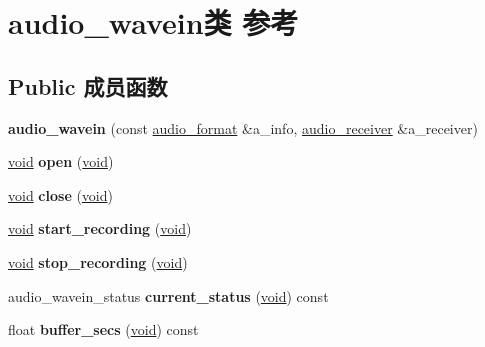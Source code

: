 \hypertarget{classaudio__wavein}{}\section{audio\+\_\+wavein类 参考}
\label{classaudio__wavein}
\subsection*{Public 成员函数}
\begin{DoxyCompactItemize}
\item 
\mbox{\label{classaudio__wavein_a3f4a60db164a3646b027a32fa001e06b}} 
{\bfseries audio\+\_\+wavein} (const \hyperlink{classaudio__format}{audio\+\_\+format} \&a\+\_\+info, \hyperlink{classaudio__receiver}{audio\+\_\+receiver} \&a\+\_\+receiver)
\item 
\mbox{\label{classaudio__wavein_a0a6dfe71a9333665ee17277e94676b23}} 
\hyperlink{interfacevoid}{void} {\bfseries open} (\hyperlink{interfacevoid}{void})
\item 
\mbox{\label{classaudio__wavein_af5d19fc68e399a74c563c0e938ca2d3a}} 
\hyperlink{interfacevoid}{void} {\bfseries close} (\hyperlink{interfacevoid}{void})
\item 
\mbox{\label{classaudio__wavein_a23f838b87df4a98fa198ec9a50a4fad9}} 
\hyperlink{interfacevoid}{void} {\bfseries start\+\_\+recording} (\hyperlink{interfacevoid}{void})
\item 
\mbox{\label{classaudio__wavein_a4c926a27ba72d70bf64bf8592983bee2}} 
\hyperlink{interfacevoid}{void} {\bfseries stop\+\_\+recording} (\hyperlink{interfacevoid}{void})
\item 
\mbox{\label{classaudio__wavein_a6d2e6607486c7f5f1ab72778bfb24984}} 
audio\+\_\+wavein\+\_\+status {\bfseries current\+\_\+status} (\hyperlink{interfacevoid}{void}) const
\item 
\mbox{\label{classaudio__wavein_a466f079562ad3d5996286aced70d9b2d}} 
float {\bfseries buffer\+\_\+secs} (\hyperlink{interfacevoid}{void}) const
\item 
\mbox{\label{classaudio__wavein_a00c561ff9abc3d065de3b549e3744844}} 

\end{DoxyCompactItemize}
